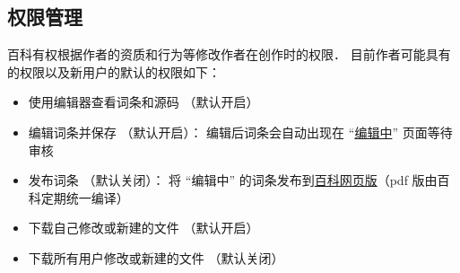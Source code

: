 \subsection{权限管理}
百科有权根据作者的资质和行为等修改作者在创作时的权限． 目前作者可能具有的权限以及新用户的默认的权限如下：
\begin{itemize}
\item 使用编辑器查看词条和源码 （默认开启）
\item 编辑词条并保存 （默认开启）： 编辑后词条会自动出现在 “\href{https://wuli.wiki/changed}{编辑中}” 页面等待审核
\item 发布词条 （默认关闭）： 将 “编辑中” 的词条发布到\href{https://wuli.wiki/online}{百科网页版}（pdf 版由百科定期统一编译）
\item 下载自己修改或新建的文件 （默认开启）
\item 下载所有用户修改或新建的文件 （默认关闭）
\end{itemize}
